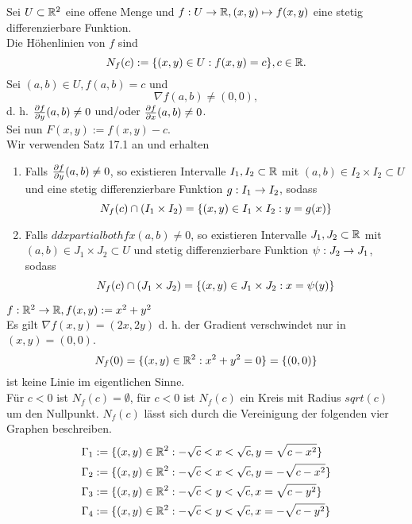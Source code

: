 \documentclass[../ana2u.tex]{subfiles}
\begin{document}
\begin{defi*}
    Sei \( U \subset \mathbb{R}^2 \) eine offene Menge und 
    \( f:U\rightarrow \mathbb{R}, (x,y) \mapsto f(x,y) \) eine 
    stetig differenzierbare Funktion.\\
    Die Höhenlinien von \(f\) sind 
    \[ N_f(c) := 
    \{ (x,y) \in U: f(x,y) = c \}, c \in \mathbb{R}. \]
    Sei \( (a,b) \in U, f(a,b) = c \) und 
    \[ \nabla f(a,b) \neq (0,0), \]
    d. h. \(\frac{\partial f}{\partial y}(a,b) \neq 0 \) und/oder 
    \(\frac{\partial f}{\partial x}(a,b) \neq 0\).\\
    Sei nun \(F(x,y) := f(x,y) - c\).\\ Wir verwenden Satz 17.1
    an und erhalten
    \begin{enumerate}
        \item Falls \( \frac{\partial f}{\partial y}(a,b) \neq 0 \), 
        so existieren Intervalle \( I_1, I_2 \subset \mathbb{R} \) 
        mit \( (a,b) \in I_2 \times I_2 \subset U \)
        und eine stetig differenzierbare Funktion \(g:I_1\rightarrow I_2\),
        sodass
        \[ N_f(c)  \cap (I_1 \times I_2) 
        = \{(x,y) \in I_1 \times I_2: y = g(x)\}\]
        \item Falls \(ddxpartialboth{f}{x}(a,b) \neq 0\), 
        so existieren Intervalle \(J_1, J_2 \subset \mathbb{R} \) mit
        \((a,b) \in J_1 \times J_2 \subset U\) und stetig 
        differenzierbare Funktion \(\psi:J_2\rightarrow J_1\), sodass
        \[ N_f(c) \cap (J_1 \times J_2) = \{(x,y) \in J_1 \times J_2: x = \psi(y)\} \]
    \end{enumerate}
\end{defi*}
\begin{bsp}
    \(f:\mathbb{R}^2\rightarrow \mathbb{R}, f(x,y) := x^2 +y^2 \)\\
    Es gilt \(\nabla f(x,y) = (2x, 2y)\)
    d. h. der Gradient verschwindet nur in \( (x,y) = (0,0) \).\\
    \[N_f(0) = \{(x,y) \in \mathbb{R}^2 : x^2 + y^2 = 0\} = \{(0,0)\} \]
    ist keine Linie im eigentlichen Sinne.\\
    Für \(c < 0\) ist \(N_f(c) = \emptyset\),
    für \(c < 0\) ist \(N_f(c)\) ein Kreis mit Radius \(sqrt(c)\) \\
    um den Nullpunkt.
    \(N_f(c)\) lässt sich durch die Vereinigung der folgenden
    vier Graphen beschreiben.
    \begin{align*}
        \Gamma_1 &:= \{(x,y) \in \mathbb{R}^2: -\sqrt{c} < x < \sqrt{c}, y = \sqrt{c - x^2}\} \\
        \Gamma_2 &:= \{(x,y) \in \mathbb{R}^2: -\sqrt{c} < x < \sqrt{c}, y = -\sqrt{c - x^2}\} \\
        \Gamma_3 &:= \{(x,y) \in \mathbb{R}^2 : -\sqrt{c} < y < \sqrt{c}, x = \sqrt{c - y^2} \} \\
        \Gamma_4 &:= \{(x,y) \in \mathbb{R}^2: -\sqrt{c} < y < \sqrt{c}, x = -\sqrt{c - y^2}\}
    \end{align*}    
\end{bsp}
\end{document}
